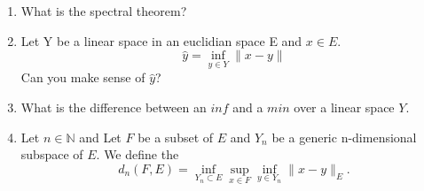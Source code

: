 \documentclass[12pt,a4paper]{article}
\begin{document}
\begin{enumerate}
	\item What is the spectral theorem?
	\item Let Y be a linear space in an euclidian space E and $x\in E$.
	\begin{equation}
		\hat y =	\inf_{y \in Y} \| x - y \|
	\end{equation}
	Can you make sense of $\hat y$?
	\item What is the difference between an $inf$ and a $min$ over a linear space $Y$. 
	\item Let $n\in\mathbb N$ and Let $F$ be a subset of $E$ and $Y_n$ be a generic n-dimensional subspace of $E$. 
	We define the 
	\begin{equation}
		d_n(F, E) 
		= \inf_{Y_n\subset E} \sup_{x \in F} \inf_{y \in Y_n} \| x - y \|_E.
	\end{equation}  
\end{enumerate}
\end{document}
